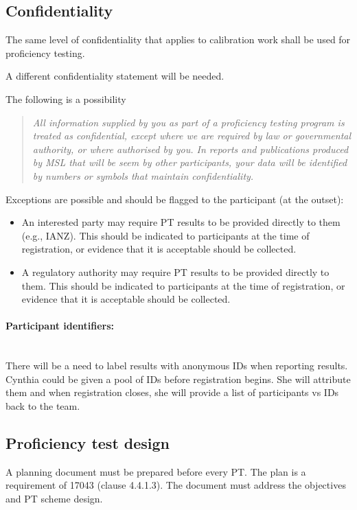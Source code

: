 \subsection{Confidentiality}
The same level of confidentiality that applies to calibration work shall be used for proficiency testing. 

A different confidentiality statement will be needed. 

The following is a possibility
\begin{quote}
\it
All information supplied by you as part of a proficiency testing program is treated as confidential, except where we are required by law or governmental authority, or where authorised by you. In reports and publications produced by MSL that will be seem by other participants, your data will be identified by numbers or symbols that maintain confidentiality.
\end{quote}

Exceptions are possible and should be flagged to the participant (at the outset):
\begin{itemize}
\item	An interested party may require PT results to be provided directly to them (e.g., IANZ). This should be indicated to participants at the time of registration, or evidence that it is acceptable should be collected.
\item	A regulatory authority may require PT results to be provided directly to them. This should be indicated to participants at the time of registration, or evidence that it is acceptable should be collected.

\end{itemize}


\paragraph{Participant identifiers:}\mbox{}\\
There will be a need to label results with anonymous IDs when reporting results. Cynthia could be given a pool of IDs before registration begins. She will attribute them and when registration closes, she will provide a list of participants vs IDs back to the team.

\subsection{Proficiency test design}
\label{ss:PT_design}
A planning document must be prepared before every PT. The plan is a requirement of 17043 (clause 4.4.1.3).  The document must address the objectives and PT scheme design. 


